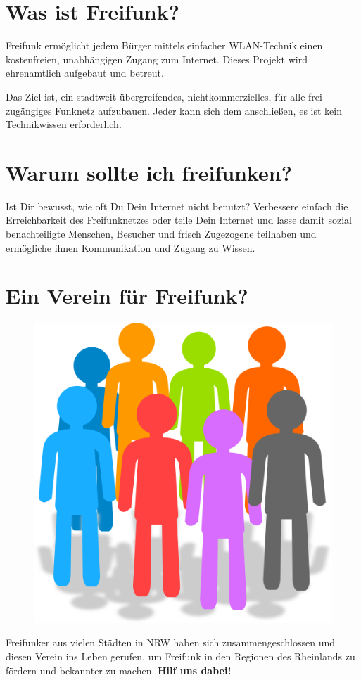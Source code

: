 \documentclass[10pt]{scrartcl}
\begin{document}
\section{\normalsize Was ist Freifunk?}
Freifunk ermöglicht jedem Bürger mittels einfacher WLAN-Technik einen 
kostenfreien, unabhängigen Zugang zum Internet.
Dieses Projekt wird ehrenamtlich aufgebaut und betreut.

Das Ziel ist, ein stadtweit übergreifendes, nichtkommerzielles, für alle frei 
zugängiges Funknetz aufzubauen.
Jeder kann sich dem anschließen, es ist kein Technikwissen erforderlich.

\section{\normalsize Warum sollte ich freifunken?}
Ist Dir bewusst, wie oft Du Dein Internet nicht benutzt? Verbessere einfach die Erreichbarkeit des Freifunknetzes oder teile Dein Internet und lasse damit sozial benachteiligte Menschen, Besucher und frisch Zugezogene teilhaben und ermögliche ihnen Kommunikation und Zugang zu Wissen.

\section{\normalsize Ein Verein für Freifunk?}
\begin{figure}
\includegraphics[scale=0.2]{Verein}
\end{figure}
Freifunker aus vielen Städten in NRW haben sich zusammengeschlossen und diesen Verein ins Leben gerufen, um Freifunk in den Regionen des Rheinlands zu fördern und bekannter zu machen.
\textbf{Hilf uns dabei!}
\end{document}
